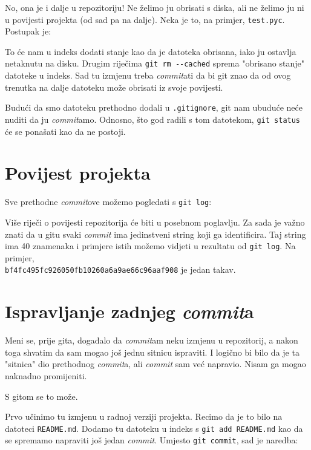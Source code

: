 No, ona je i dalje u repozitoriju!
Ne želimo ju obrisati s diska, ali ne želimo ju ni u povijesti projekta (od sad pa na dalje).
Neka je to, na primjer, \verb+test.pyc+.
Postupak je:


To će nam u indeks dodati stanje kao da je datoteka obrisana, iako ju ostavlja netaknutu na disku.
Drugim riječima \verb+git rm --cached+ sprema "obrisano stanje" datoteke u indeks.
Sad tu izmjenu treba \emph{commit}ati da bi git znao da od ovog trenutka na dalje datoteku može obrisati iz svoje povijesti.

Budući da smo datoteku prethodno dodali u \verb+.gitignore+, git nam ubuduće neće nuditi da ju \emph{commit}amo.
Odnosno, što god radili s tom datotekom, \verb+git status+ će se ponašati kao da ne postoji.

\section*{Povijest projekta}

Sve prethodne \emph{commit}ove možemo pogledati s \verb+git log+:



Više riječi o povijesti repozitorija će biti u posebnom poglavlju. 
Za sada je važno znati da u gitu svaki \emph{commit} ima jedinstveni string koji ga identificira.
Taj string ima 40 znamenaka i primjere istih možemo vidjeti u rezultatu od \verb+git log+.
Na primjer, \\\verb+bf4fc495fc926050fb10260a6a9ae66c96aaf908+ je jedan takav.

\section*{Ispravljanje zadnjeg \emph{commit}a}

Meni se, prije gita, događalo da \emph{commit}am neku izmjenu u repozitorij, a nakon toga shvatim da sam mogao još jednu sitnicu ispraviti.
I logično bi bilo da je ta "sitnica" dio prethodnog \emph{commit}a, ali \emph{commit} sam već napravio.
Nisam ga mogao naknadno promijeniti.

S gitom se to može.

Prvo učinimo tu izmjenu u radnoj verziji projekta. 
Recimo da je to bilo na datoteci \verb+README.md+.
Dodamo tu datoteku u indeks s \verb+git add README.md+ kao da se spremamo napraviti još jedan \emph{commit}.
Umjesto \verb+git commit+, sad je naredba:

